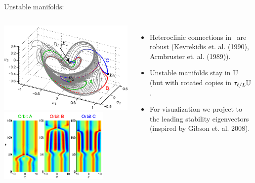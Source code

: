 \documentclass{beamer}
\begin{document}
\begin{frame}{Unstable manifolds: }
 \begin{columns}
	\includegraphics[width=\textwidth,height=0.6\textheight]{../../figs/ks22_E2_manifold_c}\\
	\includegraphics[width=0.8\textwidth,height=0.3\textheight]{../../figs/ks22_E2_orbits_c}		
 \begin{itemize}
  \item Heteroclinic connections in \KSe\ are robust (Kevrekidis et. al. (1990), Armbruster et. al. (1989)).
  \item Unstable manifolds stay in $\mathbb{U}$ (but with rotated copies in $\tau_{\ell/L}\mathbb{U}$.
  \item For visualization we project to the leading stability eigenvectors (inspired by Gibson et. al. 2008).
 \end{itemize}
 \end{columns}
	
\end{frame}
\end{document}

